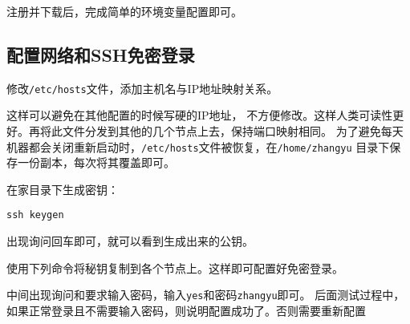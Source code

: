 注册并下载后，完成简单的环境变量配置即可。


\subsection{配置网络和SSH免密登录}
修改\lstinline{/etc/hosts}文件，添加主机名与IP地址映射关系。

这样可以避免在其他配置的时候写硬的IP地址，
不方便修改。这样人类可读性更好。再将此文件分发到其他的几个节点上去，保持端口映射相同。
为了避免每天机器都会关闭重新启动时，\lstinline{/etc/hosts}文件被恢复，在\lstinline{/home/zhangyu}
目录下保存一份副本，每次将其覆盖即可。

在家目录下生成密钥：
\begin{lstlisting}[style=mysh]
ssh keygen	
\end{lstlisting}	
出现询问回车即可，就可以看到生成出来的公钥。

使用下列命令将秘钥复制到各个节点上。这样即可配置好免密登录。

中间出现询问和要求输入密码，输入\lstinline{yes}和密码\lstinline{zhangyu}即可。
后面测试过程中，如果正常登录且不需要输入密码，则说明配置成功了。否则需要重新配置

